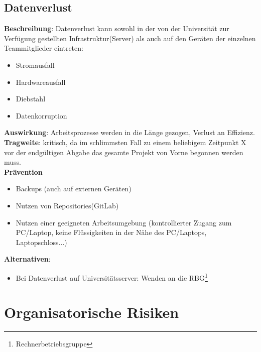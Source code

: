 \documentclass[a4paper, 12pt, titlepage]{scrartcl}
\begin{document}
	\subsection{Datenverlust}
		\textbf{Beschreibung}: Datenverlust kann sowohl in der von der Universit\"at zur Verf\"ugung gestellten Infrastruktur(Server) als auch auf den Ger\"aten der einzelnen Teammitglieder eintreten:
			\begin{itemize}
				\item Stromausfall
				\item Hardwareausfall
				\item Diebstahl
				\item Datenkorruption
			\end{itemize}
		\textbf{Auswirkung}: Arbeitsprozesse werden in die L\"ange gezogen, Verlust an Effizienz.\\
		\textbf{Tragweite}: kritisch, da im schlimmsten Fall zu einem beliebigem Zeitpunkt X vor der endg\"ultigen Abgabe das gesamte Projekt von Vorne begonnen werden muss.\\
		\textbf{Pr\"avention}
			\begin{itemize}
				\item Backups (auch auf externen Ger\"aten)
				\item Nutzen von Repositories(GitLab)
				\item Nutzen einer geeigneten Arbeitsumgebung (kontrollierter Zugang zum PC/Laptop, keine Fl\"ussigkeiten in der N\"ahe des PC/Laptops, Laptopschloss...)
			\end{itemize}
		\textbf{Alternativen}: 
			\begin{itemize}
				\item Bei Datenverlust auf Universit\"atsserver: Wenden an die RBG\footnote{Rechnerbetriebsgruppe}
			\end{itemize}

\newpage
\section{Organisatorische Risiken}
\end{document}
